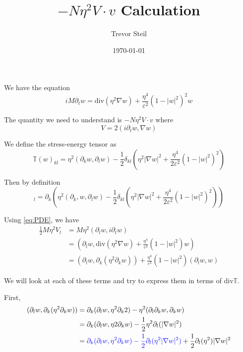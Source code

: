 \documentclass[a4paper]{article}
\title{$-N \eta^2 V \cdot v$ Calculation }
\date{\today}
\author{Trevor Steil}
\renewcommand{\div}{\mathrm{div}}
\begin{document}
\maketitle

We have the equation
\begin{equation}
  i M \partial_t w = \div (\eta^2 \nabla w) + \frac{\eta^4}{\varepsilon^2} (1-|w|^2)^2 w
  \label{eq:PDE}
\end{equation}

The quantity we need to understand is $-N \eta^2 V \cdot v$ where
\begin{equation}
  V = 2 ( i \partial_t w, \nabla w )
  \label{def:V}
\end{equation}

We define the stress-energy tensor as
\begin{equation}
  \mathbb{T}(w)_{kl} = \eta^2 (\partial_k w, \partial_l w) - \frac{1}{2} \delta_{kl} \left( \eta^2 | \nabla w |^2 + \frac{\eta^4}{2 \varepsilon^2}
  (1-|w|^2)^2 \right)
  \label{def:T}
\end{equation}

Then by definition
\begin{equation}
  [ \div \mathbb{T}(w) ]_l = \partial_k \left( \eta^2 (\partial_k, w, \partial_l w) - \frac{1}{2} \delta_{kl} \left( \eta^2 |\nabla w|^2 +
  \frac{\eta^4}{2 \varepsilon^2} ( 1- |w|^2 )^2 \right) \right)
  \label{eq:div_T}
\end{equation}

Using \eqref{eq:PDE}, we have
\begin{align}
  \frac{1}{2} M \eta^2 V_l &= M \eta^2 ( \partial_l w, i \partial_t w ) \nonumber \\
  &= \left( \partial_l w, \div ( \eta^2 \nabla w ) + \frac{\eta^4}{\varepsilon^2}( 1 - |w|^2 )w \right) \nonumber \\
  &= ( \partial_l w, \partial_k ( \eta^2 \partial_k w ) ) + \frac{\eta^4}{\varepsilon^2} ( 1 - |w|^2 ) ( \partial_l w, w )
  \label{eq:V_l}
\end{align}

We will look at each of these terms and try to express them in terms of $\div \mathbb{T}$.

First,
\begin{align}
  ( \partial_l w, \partial_k ( \eta^2 \partial_k w ) ) &= \partial_k ( \partial_l w, \eta^2 \partial_k 2) - \eta^2 ( \partial_l \partial_k w,
  \partial_k w ) \nonumber \\
  &= \partial_k ( \partial_l w, \eta2 \partial_k w) - \frac{1}{2} \eta^2 \partial_l ( | \nabla w |^2 ) \nonumber \\
  &= { \color{blue} \partial_k ( \partial_l w, \eta^2 \partial_k w) - \frac{1}{2} \partial_l ( \eta^2 |\nabla w|^2 ) } + \frac{1}{2} \partial_l
  (\eta^2) | \nabla w |^2
  \label{eq:V_l_term1}
\end{align}
\end{document}
